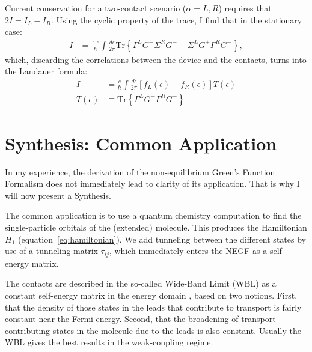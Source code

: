 Current conservation for a two-contact scenario ($\alpha=L,R$) requires that $2 I = I_L - I_R$. Using the cyclic property of the trace, I find that in the stationary case:
\begin{align*}
I &= \frac{\imath e}{\hbar} \int \frac{d\epsilon}{2\pi} \text{Tr}\left\{ \Gamma^L G^+ \Sigma^R G^- - \Sigma^L G^+ \Gamma^R G^-\right\},
\end{align*}
which, discarding the correlations between the device and the contacts, turns into the Landauer formula:
\begin{align}
I &= \frac{e}{\hbar} \int \frac{d\epsilon}{2\pi} \left[ f_L(\epsilon) - f_R(\epsilon)\right] T(\epsilon) \label{eq:landauer}\\
T(\epsilon)&\equiv \text{Tr}\left\{ \Gamma^L G^+ \Gamma^R G^-\right\}\nonumber
\end{align}

\section{Synthesis: Common Application}
\label{sec:synthesis}


In my experience, the derivation of the non-equilibrium Green's Function Formalism does not immediately lead to clarity of its application. That is why I will now present a Synthesis.

The common application is to use a quantum chemistry computation to find the single-particle orbitals of the (extended) molecule. This produces the Hamiltonian $H_1$ (equation~\ref{eq:hamiltonian}). We add tunneling between the different states by use of a tunneling matrix $\tau_{ij}$, which immediately enters the NEGF as a self-energy matrix. 

The contacts are described in the so-called Wide-Band Limit (WBL) as a constant self-energy matrix in the energy domain \cite{wbl}, based on two notions. First, that the density of those states in the leads that contribute to transport  is fairly constant near the Fermi energy. Second, that the broadening of transport-contributing states in the molecule due to the leads is also constant. Usually the WBL gives the best results in the weak-coupling regime.

